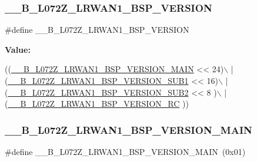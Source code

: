 \subsubsection{\texorpdfstring{\+\_\+\+\_\+\+B\+\_\+\+L072\+Z\+\_\+\+L\+R\+W\+A\+N1\+\_\+\+B\+S\+P\+\_\+\+V\+E\+R\+S\+I\+ON}{\_\_B\_L072Z\_LRWAN1\_BSP\_VERSION}}
{\footnotesize\ttfamily \#define \+\_\+\+\_\+\+B\+\_\+\+L072\+Z\+\_\+\+L\+R\+W\+A\+N1\+\_\+\+B\+S\+P\+\_\+\+V\+E\+R\+S\+I\+ON}

{\bfseries Value\+:}
\begin{DoxyCode}
((\hyperlink{group__B-L072Z-LRWAN1__LOW__LEVEL__Private__Defines_gaf5f53a499afef1aaa3850de7086a11a5}{\_\_B\_L072Z\_LRWAN1\_BSP\_VERSION\_MAIN} << 24)\(\backslash\)
                                             |(\hyperlink{group__B-L072Z-LRWAN1__LOW__LEVEL__Private__Defines_ga682147e46afbdf8d1002615e3ff7ad4a}{\_\_B\_L072Z\_LRWAN1\_BSP\_VERSION\_SUB1}
       << 16)\(\backslash\)
                                             |(\hyperlink{group__B-L072Z-LRWAN1__LOW__LEVEL__Private__Defines_gaf0b4c3a1aa8fd40d74fc5fe1c845059e}{\_\_B\_L072Z\_LRWAN1\_BSP\_VERSION\_SUB2}
       << 8 )\(\backslash\)
                                             |(\hyperlink{group__B-L072Z-LRWAN1__LOW__LEVEL__Private__Defines_ga1c5543dd393ec382e3cee4c35b86c9cd}{\_\_B\_L072Z\_LRWAN1\_BSP\_VERSION\_RC}
      ))
\end{DoxyCode}
\mbox{\label{group__B-L072Z-LRWAN1__LOW__LEVEL__Private__Defines_gaf5f53a499afef1aaa3850de7086a11a5}} 
\subsubsection{\texorpdfstring{\+\_\+\+\_\+\+B\+\_\+\+L072\+Z\+\_\+\+L\+R\+W\+A\+N1\+\_\+\+B\+S\+P\+\_\+\+V\+E\+R\+S\+I\+O\+N\+\_\+\+M\+A\+IN}{\_\_B\_L072Z\_LRWAN1\_BSP\_VERSION\_MAIN}}
{\footnotesize\ttfamily \#define \+\_\+\+\_\+\+B\+\_\+\+L072\+Z\+\_\+\+L\+R\+W\+A\+N1\+\_\+\+B\+S\+P\+\_\+\+V\+E\+R\+S\+I\+O\+N\+\_\+\+M\+A\+IN~(0x01)}



